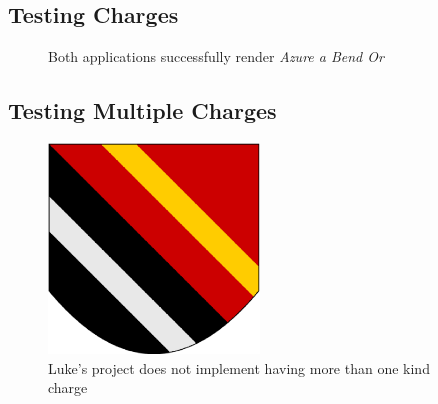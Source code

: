 \subsection{Testing Charges}

\begin{figure}[H]
\hfill
{}
\hfill
\caption{Both applications successfully render \emph{Azure a Bend Or}}
\end{figure}


\subsection{Testing Multiple Charges}

\begin{figure}[H]
  \centering
    \includegraphics[width=0.5\textwidth]{testing/images/vsubtom.eps}
  \caption{Luke's project does not implement having more than one kind charge}
\end{figure}



